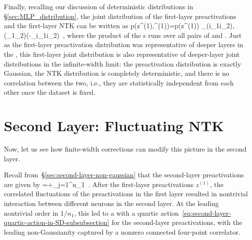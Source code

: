 Finally, recalling our discussion of deterministic distributions in \S\ref{sec:MLP_distribution}, the joint distribution of the first-layer preactivations and the first-layer NTK can be written as
\be
p\!\le(z^{(1)},\NTK^{(1)}\Big\vert \D\ri)=p\!\le(z^{(1)}\Big\vert \D\ri) \prod_{(i_1i_2),(\alpha_1\alpha_2)}\delta\!\le(-\delta_{i_1i_2}\ri)\, ,
\ee
where the product of the s runs over all pairs of  and .  Just as the first-layer preactivation distribution was representative of deeper layers in the , this first-layer joint distribution is also representative of deeper-layer joint distributions in the infinite-width limit: the preactivation distribution is exactly Gaussian, the NTK distribution is completely deterministic, and there is no correlation between the two, i.e., they are statistically independent from each other once the dataset is fixed.


\section{Second Layer: Fluctuating NTK}
\label{sec:second-layer-fluctuating-NTK}
Now, let us see how finite-width corrections can modify this picture in the second layer.

Recall from~\S\ref{sec:second-layer-non-gaussian} that the second-layer preactivations are given by
\be\label{eq:second-layer-preactivations-reprint}
=+\sum_{j=1}^{n_{1}}\, .%
\ee
After  the first-layer preactivations $z^{(1)}$, the correlated fluctuations of the preactivations in the first layer resulted in nontrivial interaction between different neurons in the second layer.
At the leading nontrivial order in $1/n_1$, this led to a  with a quartic action~\eqref{eq:second-layer-quartic-action-in-SD-subsubsection} for the second-layer preactivations, with the leading non-Gaussianity captured by a nonzero connected four-point correlator. %



